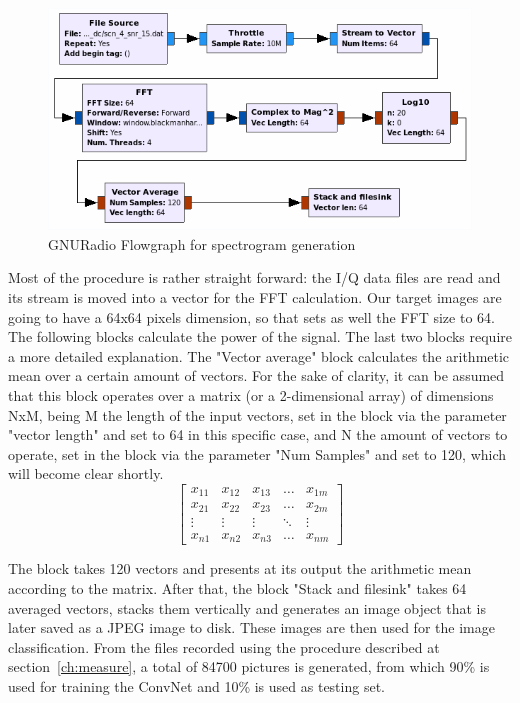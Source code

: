 \begin{figure}[!htb]
    \centering
    \includegraphics[width=\textwidth]{figures/specgram_generation}
    \caption{GNURadio Flowgraph for spectrogram generation}
    \label{fig:specgram_generation}
\end{figure}

Most of the procedure is rather straight forward: the I/Q data files are read and its stream is moved into a vector for the \ac{FFT} calculation. Our target images are going to have a 64x64 pixels dimension, so that sets as well the FFT size to 64. The following blocks calculate the power of the signal. The last two blocks require a more detailed explanation.
The "Vector average" block calculates the arithmetic mean over a certain amount of vectors. For the sake of clarity, it can be assumed that this block operates over a matrix (or a 2-dimensional array) of dimensions NxM, being M the length of the input vectors, set in the block via the parameter "vector length" and set to 64 in this specific case, and N the amount of vectors to operate, set in the block via the parameter "Num Samples" and set to 120, which will become clear shortly.
\[
\begin{bmatrix}
    x_{11} & x_{12} & x_{13} & \dots  & x_{1m} \\
    x_{21} & x_{22} & x_{23} & \dots  & x_{2m} \\
    \vdots & \vdots & \vdots & \ddots & \vdots \\
    x_{n1} & x_{n2} & x_{n3} & \dots  & x_{nm}
\end{bmatrix}
\]

The block takes 120 vectors and presents at its output the arithmetic mean according to the matrix. After that, the block "Stack and filesink" takes 64 averaged vectors, stacks them vertically and generates an image object that is later saved as a JPEG image to disk. These images are then used for the image classification. From the files recorded using the procedure described at section~\ref{ch:measure}, a total of 84700 pictures is generated, from which 90\% is used for training the \ac{ConvNet} and 10\% is used as testing set.

